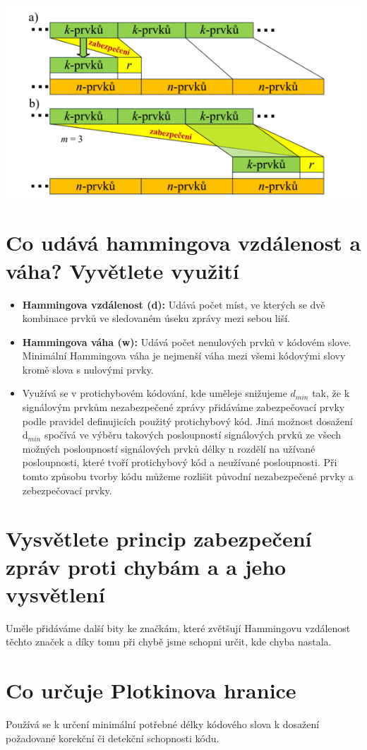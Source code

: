 \includegraphics[]{images/zabezpečování.png}

\section{Co udává hammingova vzdálenost a váha? Vyvětlete využití}

\begin{itemize}
    \item \textbf{Hammingova vzdálenost (d):} Udává počet míst, ve kterých se dvě kombinace prvků ve sledovaném úseku zprávy mezi sebou liší.
    

    
    \item \textbf{Hammingova váha (w):} Udává počet nenulových prvků v kódovém slove.
    Minimální Hammingova váha je nejmenší váha mezi všemi kódovými slovy kromě slova s nulovými prvky.
    
    \item Využívá se v protichybovém kódování, kde uměleje snižujeme $d_{min}$ tak, že k signálovým prvkům nezabezpečené zprávy přidáváme zabezpečovací prvky podle pravidel definujicích použitý protichybový kód.
    Jiná možnost dosažení d$_{min}$ spočívá ve výběru takových posloupností signálových prvků ze všech možných posloupností signálových prvků délky n rozdělí na užívané posloupnosti, které tvoří protichybový kód a neužívané posloupnosti.  Při tomto způsobu tvorby kódu můžeme rozlišit původní nezabezpečené prvky a zebezpečovací prvky.
\end{itemize}
\section{Vysvětlete princip zabezpečení zpráv proti chybám a a jeho vysvětlení}
Uměle přidáváme další bity ke značkám, které zvětšují Hammingovu vzdálenost těchto značek a díky tomu při chybě jsme schopni určit, kde chyba nastala.

\section{Co určuje Plotkinova hranice}
Používá se k určení minimální potřebné délky kódového slova k dosažení požadované korekční či detekční schopnosti kódu.
